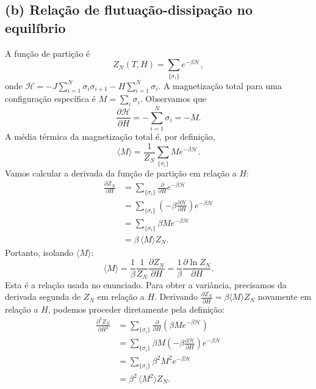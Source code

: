 \documentclass[11pt,a4paper]{article}
\begin{document}
\subsection*{(b) Relação de flutuação-dissipação no equilíbrio}
%
A função de partição é
%
\begin{equation}
Z_N(T,H) = \sum_{\{\sigma_i\}} e^{-\beta \mathcal H},
\end{equation}
%
onde $\mathcal H = -J\sum_{i=1}^N \sigma_i\sigma_{i+1} - H\sum_{i=1}^N\sigma_i$. A magnetização total para uma configuração específica é $M = \sum_i \sigma_i$. Observamos que
%
\begin{equation}
\frac{\partial \mathcal H}{\partial H} = - \sum_{i=1}^N \sigma_i = -M.
\end{equation}
%
A média térmica da magnetização total é, por definição,
%
\begin{equation}
\langle M \rangle = \frac{1}{Z_N} \sum_{\{\sigma_i\}} M e^{-\beta \mathcal H}.
\end{equation}
%
Vamos calcular a derivada da função de partição em relação a $H$:
%
\begin{align}
\frac{\partial Z_N}{\partial H}
&= \sum_{\{\sigma_i\}} \frac{\partial}{\partial H} e^{-\beta \mathcal H} \\
&= \sum_{\{\sigma_i\}} \left( -\beta \frac{\partial \mathcal H}{\partial H} \right) e^{-\beta \mathcal H} \\
&= \sum_{\{\sigma_i\}} \beta M e^{-\beta \mathcal H} \\
&= \beta \, \langle M \rangle Z_N.
\label{eq:dZ_dH}
\end{align}
%
Portanto, isolando $\langle M \rangle$:
%
\begin{equation}
\langle M \rangle = \frac{1}{\beta} \frac{1}{Z_N} \frac{\partial Z_N}{\partial H}
= \frac{1}{\beta} \frac{\partial \ln Z_N}{\partial H}.
\label{eq:M_beta_lnZ}
\end{equation}
%
Esta é a relação usada no enunciado. Para obter a variância, precisamos da derivada segunda de $Z_N$ em relação a $H$. Derivando $\frac{\partial Z_N}{\partial H} = \beta \langle M \rangle Z_N$ novamente em relação a $H$, podemos proceder diretamente pela definição:
%
\begin{align}
\frac{\partial^2 Z_N}{\partial H^2}
&= \sum_{\{\sigma_i\}} \frac{\partial}{\partial H} \left( \beta M e^{-\beta \mathcal H} \right) \\
&= \sum_{\{\sigma_i\}} \beta M \left( -\beta \frac{\partial \mathcal H}{\partial H} \right) e^{-\beta \mathcal H} \\
&= \sum_{\{\sigma_i\}} \beta^2 M^2 e^{-\beta \mathcal H} \\
&= \beta^2 \, \langle M^2 \rangle Z_N.
\label{eq:d2Z_dH2}
\end{align}
\end{document}
